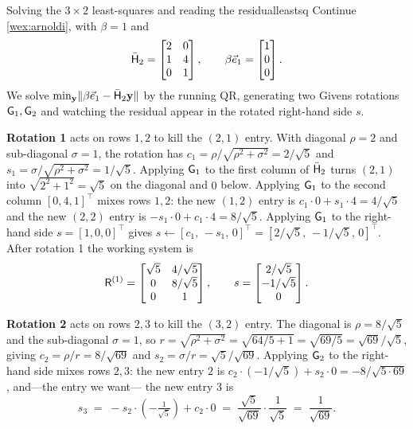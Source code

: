 \begin{workedexample}{Solving the $3\times2$ least-squares and reading the residual}{leastsq}
Continue \cref{wex:arnoldi}, with $\beta=1$ and
\[
  \bar{\mathsf{H}}_2=\begin{bmatrix} 2 & 0\\ 1 & 4\\ 0 & 1\end{bmatrix},
  \qquad
  \beta\vec e_1=\begin{bmatrix}1\\0\\0\end{bmatrix}.
\]
We solve $\min_{\mathbf{y}}\lVert\beta\vec e_1-\bar{\mathsf{H}}_2\mathbf{y}\rVert$ by the running QR,
generating two Givens rotations $\mathsf{G}_1,\mathsf{G}_2$ and watching the residual
appear in the rotated right-hand side $s$.

\textbf{Rotation 1} acts on rows $1,2$ to kill the $(2,1)$ entry. With diagonal
$\rho=2$ and sub-diagonal $\sigma=1$, the rotation has
$c_1=\rho/\sqrt{\rho^2+\sigma^2}=2/\sqrt5$ and
$s_1=\sigma/\sqrt{\rho^2+\sigma^2}=1/\sqrt5$. Applying $\mathsf{G}_1$ to the first
column of $\bar{\mathsf{H}}_2$ turns $(2,1)$ into $\sqrt{2^2+1^2}=\sqrt5$ on the
diagonal and $0$ below. Applying $\mathsf{G}_1$ to the second column
$[0,4,1]^{\top}$ mixes rows $1,2$: the new $(1,2)$ entry is
$c_1\!\cdot\!0+s_1\!\cdot\!4=4/\sqrt5$ and the new $(2,2)$ entry is
$-s_1\!\cdot\!0+c_1\!\cdot\!4=8/\sqrt5$. Applying $\mathsf{G}_1$ to the right-hand side
$s=[1,0,0]^{\top}$ gives
$s\leftarrow[c_1,\,-s_1,\,0]^{\top}=[2/\sqrt5,\,-1/\sqrt5,\,0]^{\top}$. After
rotation 1 the working system is
\[
  \mathsf{R}^{(1)}=\begin{bmatrix} \sqrt5 & 4/\sqrt5\\ 0 & 8/\sqrt5\\ 0 & 1\end{bmatrix},
  \qquad
  s=\begin{bmatrix} 2/\sqrt5\\ -1/\sqrt5\\ 0\end{bmatrix}.
\]

\textbf{Rotation 2} acts on rows $2,3$ to kill the $(3,2)$ entry. The diagonal is
$\rho=8/\sqrt5$ and the sub-diagonal $\sigma=1$, so
$r=\sqrt{\rho^2+\sigma^2}=\sqrt{64/5+1}=\sqrt{69/5}=\sqrt{69}/\sqrt5$, giving
$c_2=\rho/r=8/\sqrt{69}$ and $s_2=\sigma/r=\sqrt5/\sqrt{69}$. Applying $\mathsf{G}_2$ to
the right-hand side mixes rows $2,3$: the new entry $2$ is
$c_2\!\cdot\!(-1/\sqrt5)+s_2\!\cdot\!0=-8/\sqrt{5\cdot69}$, and---the entry we want---
the new entry $3$ is
\[
  s_3 \;=\; -s_2\cdot\!\left(-\tfrac{1}{\sqrt5}\right)+c_2\cdot 0
        \;=\; \frac{\sqrt5}{\sqrt{69}}\cdot\frac{1}{\sqrt5}
        \;=\; \frac{1}{\sqrt{69}}.
\]


\end{workedexample}
